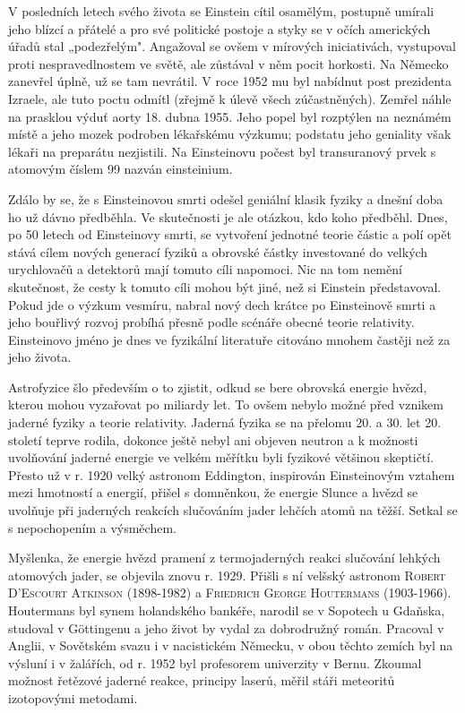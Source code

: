         V posledních letech svého života se Einstein cítil osamělým, postupně umírali jeho blízcí a
        přátelé a pro své politické postoje a styky se v očích amerických úřadů stal „podezřelým".
        Angažoval se ovšem v mírových iniciativách, vystupoval proti nespravedlnostem ve světě, ale
        zůstával v něm pocit horkosti. Na Německo zanevřel úplně, už se tam nevrátil. V roce 1952 mu
        byl nabídnut post prezidenta Izraele, ale tuto poctu odmítl (zřejmě k úlevě všech
        zúčastněných). Zemřel náhle na prasklou výduť aorty 18. dubna 1955. Jeho popel byl rozptýlen
        na neznámém místě a jeho mozek podroben lékařskému výzkumu; podstatu jeho geniality však
        lékaři na preparátu nezjistili. Na Einsteinovu počest byl transuranový prvek s atomovým
        číslem 99 nazván einsteinium.

        Zdálo by se, že s Einsteinovou smrti odešel geniální klasik fyziky a dnešní doba ho už dávno
        předběhla. Ve skutečnosti je ale otázkou, kdo koho předběhl. Dnes, po 50 letech od
        Einsteinovy smrti, se vytvoření jednotné teorie částic a polí opět stává cílem nových
        generací fyziků a obrovské částky investované do velkých urychlovačů a detektorů mají tomuto
        cíli napomoci. Nic na tom nemění skutečnost, že cesty k tomuto cíli mohou být jiné, než si
        Einstein představoval. Pokud jde o výzkum vesmíru, nabral nový dech krátce po Einsteinově
        smrti a jeho bouřlivý rozvoj probíhá přesně podle scénáře obecné teorie relativity.
        Einsteinovo jméno je dnes ve fyzikální literatuře citováno mnohem častěji než za jeho
        života.

        Astrofyzice šlo především o to zjistit, odkud se bere obrovská energie hvězd, kterou mohou
        vyzařovat po miliardy let. To ovšem nebylo možné před vznikem jaderné fyziky a teorie
        relativity. Jaderná fyzika se na přelomu 20. a 30. let 20. století teprve rodila, dokonce
        ještě nebyl ani objeven neutron a k možnosti uvolňování jaderné energie ve velkém měřítku
        byli fyzikové většinou skeptičtí. Přesto už v r. 1920 velký astronom Eddington, inspirován
        Einsteinovým vztahem mezi hmotností a energií, přišel s domněnkou, že energie Slunce a hvězd
        se uvolňuje při jaderných reakcích slučováním jader lehčích atomů na těžší. Setkal se s
        nepochopením a výsměchem.

        Myšlenka, že energie hvězd pramení z termojaderných reakci slučování lehkých atomových
        jader, se objevila znovu r. 1929. Přišli s ní velšský astronom \textsc{Robert D'Escourt
        Atkinson} (1898-1982) a \textsc{Friedrich George Houtermans} (1903-1966). Houtermans byl
        synem holandského bankéře, narodil se v Sopotech u Gdaňska, studoval v Göttingenu a jeho
        život by vydal za dobrodružný román. Pracoval v Anglii, v Sovětském svazu i v nacistickém
        Německu, v obou těchto zemích byl na výsluní i v žalářích, od r. 1952 byl profesorem
        univerzity v Bernu. Zkoumal možnost řetězové jaderné reakce, principy laserů, měřil stáři
        meteoritů izotopovými metodami.


